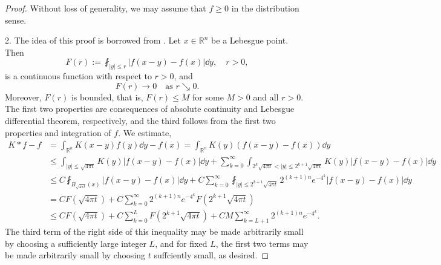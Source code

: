 \begin{proof}
	Without loss of generality, we may assume that $f\geq0$ in the distribution sense.
	
	2. The idea of this proof is borrowed from \cite[Theorem~2.1 in Chapter~3]{Stein2005}. Let $x\in\mathbb R^n$ be a Lebesgue point. Then  
	\[
	F(r) := \fint_{|y|\leq r} |f(x-y)-f(x)|\dd y,\quad r > 0,
	\]
	is a continuous function with respect to $r>0$,
	and 
	\[
	F(r)\to 0\quad \text{as }r\searrow0.
	\]
	Moreover, $F(r)$ is bounded, that is, $F(r)\leq M$ for some $M>0$ and all $r>0$. 
	The first two properties are consequences of absolute continuity and Lebesgue differential theorem, respectively, and the third follows from the first two properties and integration of $f$.
	We estimate,
	\begin{align*}
		K*f-f &= \int_{\mathbb{R}^n}K(x-y)f(y)\dd y - f(x) = \int_{\mathbb R^n}K(y)(f(x-y)-f(x))\dd y\\
		&\leq \int_{|y|\leq\sqrt {4\pi t}}K(y)|f(x-y)-f(x)|\dd y 
		+ \sum_{k=0}^{\infty}\int_{2^k\sqrt {4\pi t} < |y|\leq 2^{k+1}\sqrt {4\pi t}}K(y)|f(x-y)-f(x)|\dd y\\
		&\leq C\fint_{B_{\sqrt {4\pi t}}(x)}|f(x-y)-f(x)|\dd y 
			+ C\sum_{k=0}^\infty\fint_{|y|\leq 2^{k+1}\sqrt{4\pi t}}2^{(k+1)n}e^{-4^k}|f(x-y)-f(x)|\dd y \\
		&= CF(\sqrt{4\pi t}) + C\sum_{k=0}^\infty 2^{(k+1)n}e^{-4^k} F(2^{k+1}\sqrt{4\pi t})\\
		&\leq CF(\sqrt{4\pi t}) + C\sum_{k=0}^{L}F(2^{k+1}\sqrt{4\pi t}) + C M \sum_{k=L+1}^\infty 2^{(k+1)n}e^{-4^k}.
	\end{align*}
	The third term of the right side of this inequality may be made arbitrarily small 
  by choosing a sufficiently large integer $L$, 
  and for fixed $L$, the first two terms may be made arbitrarily small by choosing $t$ suffciently small,
	as desired.


\end{proof}
